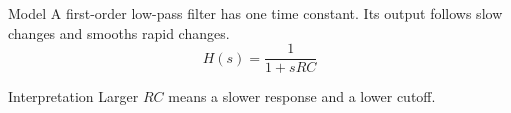 \begin{notepanels}[columns=2,widths={2,1},gap=6mm]
  \begin{notepanel}{Model}
    A first-order low-pass filter has one time constant.
    Its output follows slow changes and smooths rapid changes.
    \[H(s)=\frac{1}{1+sRC}\]
  \end{notepanel}
  \begin{notepanel}{Interpretation}
    Larger $RC$ means a slower response and a lower cutoff.
  \end{notepanel}
\end{notepanels}
